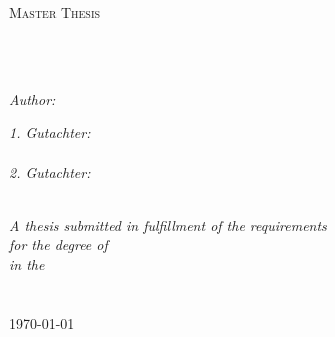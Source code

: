 \documentclass[
12pt, %
english, %
onehalfspacing, %
nolistspacing, %
liststotoc, %
parskip, %
headsepline, %
chapterinoneline, %
]{MastersDoctoralThesis} %
\author{Jakob \textsc{Niedermann}} %
\begin{document}
\frontmatter %

\pagestyle{plain} %




\begin{titlepage}
\begin{center}

\vspace*{.0\textheight}
{\scshape\LARGE \univname\par}\vspace{0cm} %
\textsc{\Large Master Thesis}\\[0.5cm] %

\HRule \\[0.4cm] %
{\huge \bfseries \ttitle\par}\vspace{0.3cm} %
\HRule \\[1.5cm] %
 
\begin{minipage}[t]{0.4\textwidth}
\begin{flushleft} \large
\emph{Author:}\\
{\authorname} %
\end{flushleft}
\end{minipage}
\begin{minipage}[t]{0.4\textwidth}
\begin{flushright} \large
\emph{1. Gutachter:} \\
{\supname} \\ %
\vspace{5mm}
\emph{2. Gutachter:} \\
{\examname}
\end{flushright}
\end{minipage}\\[1cm]
 

\large \textit{A thesis submitted in fulfillment of the requirements\\ for the degree of \degreename}\\[0.3cm] %
\textit{in the}\\[0.4cm]
\groupname\\\deptname\\[0cm] %
 

{\large \today}\\[0cm] %
 
\end{center}
\end{titlepage}
\end{document}

